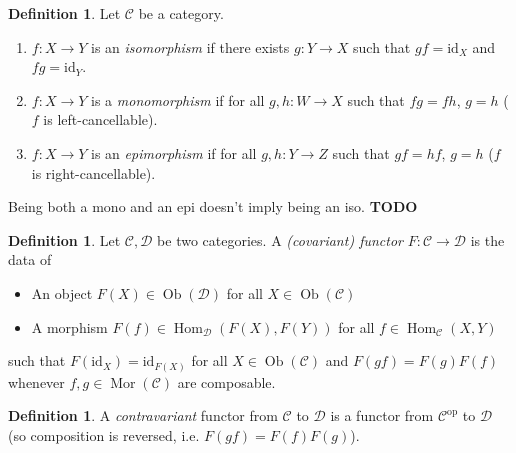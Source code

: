 \documentclass{article}
\newcommand{\id}{\mathrm{id}}
\newcommand{\op}{\mathrm{op}}
\newcommand{\cat}{\mathcal{C}}
\newcommand{\catt}{\mathcal{D}}
\DeclareMathOperator{\Ob}{Ob}
\DeclareMathOperator{\Mor}{Mor}
\DeclareMathOperator{\Hom}{Hom}
\newcommand{\todo}{\textbf{TODO}}
\newcommand{\warning}{\faExclamationTriangle \hspace{3pt}}
\theoremstyle{plain}
\theoremstyle{definition}
\newtheorem{definition}[theorem]{Definition}
\theoremstyle{remark}
\begin{document}
\begin{definition}
    Let $\cat$ be a category.
    \begin{enumerate}
        \item $f : X \to Y$ is an \emph{isomorphism} if there exists $g : Y \to X$ such that $gf = \id_X$ and $fg = \id_Y$.
        \item $f : X \to Y$ is a \emph{monomorphism} if for all $g,h : W \to X$ such that $fg = fh$, $g=h$ ($f$ is left-cancellable).
        \item $f : X \to Y$ is an \emph{epimorphism} if for all $g,h : Y \to Z$ such that $gf = hf$, $g=h$ ($f$ is right-cancellable).
    \end{enumerate}
\end{definition}

\warning Being both a mono and an epi doesn't imply being an iso. \todo

\begin{definition}
    Let $\cat,\catt$ be two categories. A \emph{(covariant) functor} $F : \cat \to \catt$ is the data of
    \begin{itemize}
        \item An object $F(X) \in \Ob(\catt)$ for all $X \in \Ob(\cat)$
        \item A morphism $F(f) \in \Hom_\catt(F(X), F(Y))$ for all $f \in \Hom_\cat (X,Y)$
    \end{itemize}
    such that $F(\id_X) = \id_{F(X)}$ for all $X \in \Ob(\cat)$ and $F(gf) = F(g)F(f)$ whenever $f,g \in \Mor(\cat)$ are composable. 
\end{definition}

\begin{definition}
    A \emph{contravariant} functor from $\cat$ to $\catt$ is a functor from $\cat^\op$ to $\catt$ (so composition is reversed, i.e. $F(gf) = F(f)F(g)$).
\end{definition}
\end{document}
